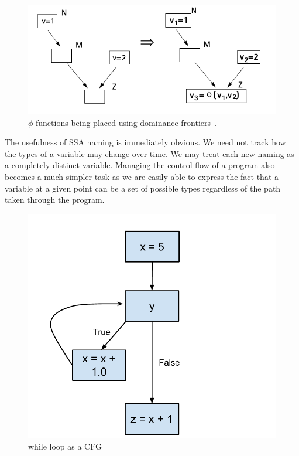 \documentclass[12pt, titlepage]{article}
\begin{document}
\begin{figure}
	\centering
	\includegraphics[scale=0.6]{images/ssaFrontiers.png}
	\caption{$\phi$ functions being placed using dominance frontiers~\cite{domianceFrontiersImage}.}
	\label{fig:dominanceFrontiers}
\end{figure} 

\indent The usefulness of SSA naming is immediately obvious. We need not track how the types of a variable may change over time. We may treat each new naming as a completely distinct variable. Managing the control flow of a program also becomes a much simpler task as we are easily able to express the fact that a variable at a given point can be a set of possible types regardless of the path taken through the program.

\begin{figure}[h]
\centering
\includegraphics[scale=0.5]{images/ssaPhiNode.pdf}
\caption{while loop as a CFG}
\label{phiCFG}
\end{figure}
\end{document}

